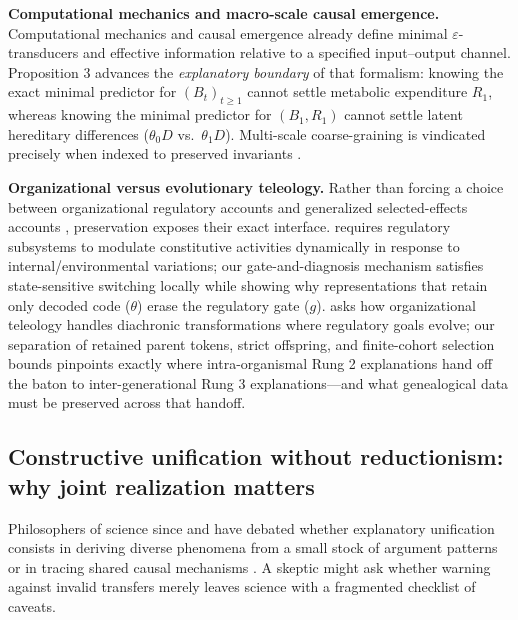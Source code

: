 \documentclass[11pt,a4paper]{article}
\begin{document}
\textbf{Computational mechanics and macro-scale causal emergence.}
Computational mechanics
\citep{shaliziCrutchfield2001, barnettCrutchfield2015} and causal
emergence \citep{hoel2013} already define minimal
\(\varepsilon\)-transducers and effective information relative to a
specified input--output channel. Proposition 3 advances the
\emph{explanatory boundary} of that formalism: knowing the exact minimal
predictor for \((B_t)_{t \ge 1}\) cannot settle metabolic expenditure
\(R_1\), whereas knowing the minimal predictor for \((B_1, R_1)\) cannot
settle latent hereditary differences (\(\theta_0 D\)
vs.~\(\theta_1 D\)). Multi-scale coarse-graining is vindicated precisely
when indexed to preserved invariants \citep{woodward2003}.

\textbf{Organizational versus evolutionary teleology.} Rather than
forcing a choice between organizational regulatory accounts
\citep{mossio2009, bich2024} and generalized selected-effects accounts
\citep{millikan1984, garson2019}, preservation exposes their exact
interface. \citet[§4--5]{bich2024} requires regulatory subsystems to
modulate constitutive activities dynamically in response to
internal/environmental variations; our gate-and-diagnosis mechanism
satisfies state-sensitive switching locally while showing why
representations that retain only decoded code (\(\theta\)) erase the
regulatory gate (\(g\)). \citet[§4--6]{cuciniello2026} asks how
organizational teleology handles diachronic transformations where
regulatory goals evolve; our separation of retained parent tokens,
strict offspring, and finite-cohort selection bounds pinpoints exactly
where intra-organismal Rung 2 explanations hand off the baton to
inter-generational Rung 3 explanations---and what genealogical data must
be preserved across that handoff.

\subsection{Constructive unification without reductionism: why joint
realization
matters}\label{constructive-unification-without-reductionism-why-joint-realization-matters}

Philosophers of science since \citet{friedman1974} and
\citet{kitcher1989} have debated whether explanatory unification
consists in deriving diverse phenomena from a small stock of argument
patterns or in tracing shared causal mechanisms
\citep{cartwright1999, craver2007}. A skeptic might ask whether warning
against invalid transfers merely leaves science with a fragmented
checklist of caveats.
\end{document}
